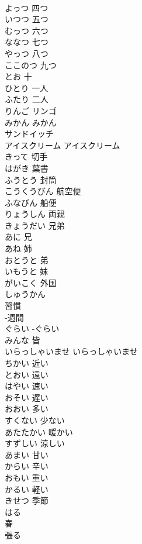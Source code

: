 \documentclass[8pt]{extreport}
\begin{document}
\begin{CJK}{UTF8}{min}
\\	よっつ	四つ
\\	いつつ	五つ
\\	むっつ	六つ
\\	ななつ	七つ
\\	やっつ	八つ
\\	ここのつ	九つ
\\	とお	十
\\	ひとり	一人
\\	ふたり	二人
\\	りんご	リンゴ
\\	みかん	みかん
\\	サンドイッチ	
\\	アイスクリーム	アイスクリーム
\\	きって	切手
\\	はがき	葉書
\\	ふうとう	封筒
\\	こうくうびん	航空便
\\	ふなびん	船便
\\	りょうしん	両親
\\	きょうだい	兄弟
\\	あに	兄
\\	あね	姉
\\	おとうと	弟
\\	いもうと	妹
\\	がいこく	外国
\\	しゅうかん	
\\	習慣 
\\	-週間 
\\	ぐらい	-ぐらい
\\	みんな	皆
\\	いらっしゃいませ	いらっしゃいませ
\\	ちかい	近い
\\	とおい	遠い
\\	はやい	速い
\\	おそい	遅い
\\	おおい	多い
\\	すくない	少ない
\\	あたたかい	暖かい
\\	すずしい	涼しい
\\	あまい	甘い
\\	からい	辛い
\\	おもい	重い
\\	かるい	軽い
\\	きせつ	季節
\\	はる	
\\	春 
\\	張る

\end{CJK}
\end{document}
